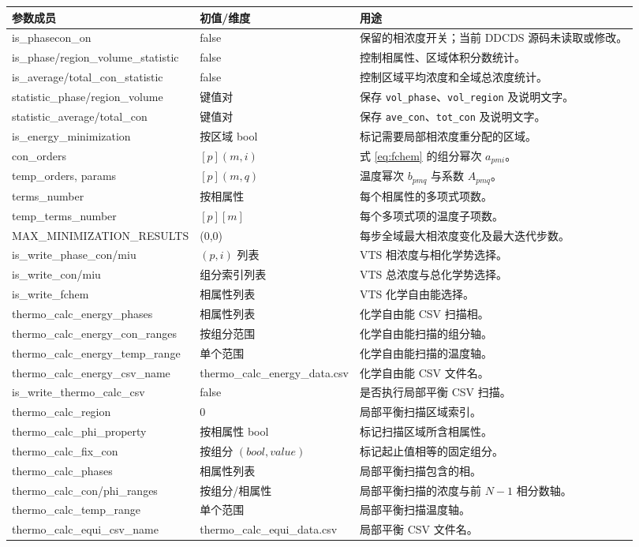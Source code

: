 \documentclass[UTF8,a4paper,11pt]{ctexart}
\newcommand{\code}[1]{\texttt{#1}}
\begin{document}
\begin{longtable}{>{\ttfamily}p{}p{}p{}}
\toprule
\normalfont 参数成员 & 初值/维度 & 用途\\
\midrule
\endhead
is\_phasecon\_on & false & 保留的相浓度开关；当前 DDCDS 源码未读取或修改。\\
is\_phase/region\_volume\_statistic & false & 控制相属性、区域体积分数统计。\\
is\_average/total\_con\_statistic & false & 控制区域平均浓度和全域总浓度统计。\\
statistic\_phase/region\_volume & 键值对 & 保存 \code{vol\_phase}、\code{vol\_region} 及说明文字。\\
statistic\_average/total\_con & 键值对 & 保存 \code{ave\_con}、\code{tot\_con} 及说明文字。\\
is\_energy\_minimization & 按区域 bool & 标记需要局部相浓度重分配的区域。\\
con\_orders & $[p](m,i)$ & 式 \eqref{eq:fchem} 的组分幂次 $a_{pmi}$。\\
temp\_orders, params & $[p](m,q)$ & 温度幂次 $b_{pmq}$ 与系数 $A_{pmq}$。\\
terms\_number & 按相属性 & 每个相属性的多项式项数。\\
temp\_terms\_number & $[p][m]$ & 每个多项式项的温度子项数。\\
MAX\_MINIMIZATION\_RESULTS & (0,0) & 每步全域最大相浓度变化及最大迭代步数。\\
is\_write\_phase\_con/miu & $(p,i)$ 列表 & VTS 相浓度与相化学势选择。\\
is\_write\_con/miu & 组分索引列表 & VTS 总浓度与总化学势选择。\\
is\_write\_fchem & 相属性列表 & VTS 化学自由能选择。\\
thermo\_calc\_energy\_phases & 相属性列表 & 化学自由能 CSV 扫描相。\\
thermo\_calc\_energy\_con\_ranges & 按组分范围 & 化学自由能扫描的组分轴。\\
thermo\_calc\_energy\_temp\_range & 单个范围 & 化学自由能扫描的温度轴。\\
thermo\_calc\_energy\_csv\_name & thermo\_calc\_energy\_data.csv & 化学自由能 CSV 文件名。\\
is\_write\_thermo\_calc\_csv & false & 是否执行局部平衡 CSV 扫描。\\
thermo\_calc\_region & 0 & 局部平衡扫描区域索引。\\
thermo\_calc\_phi\_property & 按相属性 bool & 标记扫描区域所含相属性。\\
thermo\_calc\_fix\_con & 按组分 $(bool,value)$ & 标记起止值相等的固定组分。\\
thermo\_calc\_phases & 相属性列表 & 局部平衡扫描包含的相。\\
thermo\_calc\_con/phi\_ranges & 按组分/相属性 & 局部平衡扫描的浓度与前 $N-1$ 相分数轴。\\
thermo\_calc\_temp\_range & 单个范围 & 局部平衡扫描温度轴。\\
thermo\_calc\_equi\_csv\_name & thermo\_calc\_equi\_data.csv & 局部平衡 CSV 文件名。\\
\bottomrule
\end{longtable}
\end{document}
